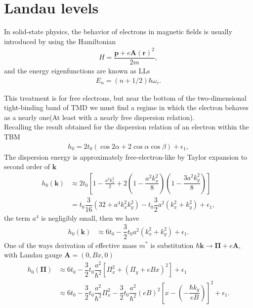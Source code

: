 \documentclass{report}
\newcommand{\f}[2]{\dfrac{#1}{#2}}
\begin{document}
\section{Landau levels}
In solid-state physics, the behavior of electrons in magnetic fields is usually introduced by using the Hamiltonian
\begin{gather}
	H = \f{\mathbf{p} + e \mathbf{A}(\mathbf{r})^{2}}{2m} ,
\end{gather}
and the energy eigenfunctions are known as \ac{LLs}
\begin{gather}
	E_{n} = \left(n + 1/2\right) \hbar \omega_{c}.
\end{gather}

This treatment is for free electrons, but near the bottom of the two-dimensional tight-binding band of \ac{TMD} we must find a regime in which the electron behaves as a nearly one(At least with a nearly free dispersion relation). \\
Recalling the result obtained for the dispersion relation of an electron within the \ac{TBM}
\begin{gather}
	h_{0} = 2 t_{0} (\cos 2\alpha + 2 \cos \alpha \cos \beta) + \epsilon_{1},
\end{gather}
The dispersion energy is approximately free-electron-like by Taylor expansion to second order of $\mathbf{k}$
\begin{equation}
	\begin{aligned}
		h_{0}(\mathbf{k})
		 & \approx 2 t_{0} \left[1 - \frac{a^{2} k_{x}^{2}}{2} + 2\left(1 - \f{a^{2} k_{x}^{2}}{8}\right)\left(1 - \f{3a^{2} k_{y}^{2}}{8}\right)\right] \\
		 & = t_{0} \f{3}{16} \left(32 + a^{4} k_{x}^{2} k_{y}^{2}\right) - t_{0} \f{3}{2} a^{2}\left(k_{x}^{2} + k_{y}^{2}\right) + \epsilon_{1} ,
	\end{aligned}
\end{equation}
the term $a^{4}$ is negligibly small, then we have
\begin{equation}
	\begin{aligned}
		h_{0}(\mathbf{k})
		 & \approx 6 t_{0} - \f{3}{2} t_{0} a^{2} (k_{x}^{2} + k_{y}^{2}) + \epsilon_{1}.
	\end{aligned}
\end{equation}
One of the ways derivation of effective mass $m^{*}$ is substitution $\hbar\mathbf{k} \rightarrow \mathbf{\Pi} + e \mathbf{A}$, with Landau gauge $\mathbf{A} = (0,Bx,0)$
\begin{equation}
	\begin{aligned}
		h_{0}(\mathbf{\Pi})
		 & \approx 6 t_{0} - \f{3}{2} t_{0} \f{a^{2}}{\hbar^{2}} \left[ \Pi_{x}^{2} + \left(\Pi_{y} + e B x\right)^{2}\right] + \epsilon_{1}                                                           \\
		 & \approx 6 t_{0} - \f{3}{2} t_{0} \f{a^{2}}{\hbar^{2}} \Pi_{x}^{2} - \f{3}{2} t_{0} \f{a^{2}}{\hbar^{2}} (e B)^{2} \left[ x - \left(- \f{\hbar k_{y}}{eB}\right) \right]^{2} + \epsilon_{1}.
	\end{aligned}
\end{equation}
\end{document}
